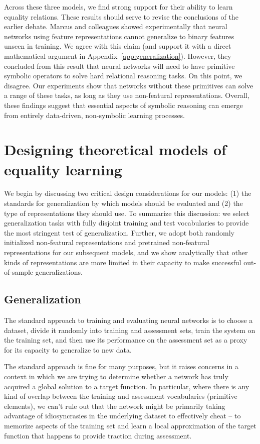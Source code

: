 \documentclass{article}
\newcommand{\appref}[1]{Appendix~\ref{#1}}
\renewcommand{\cite}{\citep}
\begin{document}
Across these three models, we find strong support for their ability to learn equality relations. These results should serve to revise the conclusions of the earlier debate. Marcus and colleagues \cite{marcus:1999,marcus:2001} showed experimentally that neural networks using feature representations cannot generalize to binary features unseen in training. We agree with this claim (and support it with a direct mathematical argument in \appref{app:generalization}). However, they concluded from this result that neural networks will need to have primitive symbolic operators to solve hard relational reasoning tasks. On this point, we disagree. Our experiments show that networks without these primitives can solve a range of these tasks, as long as they use non-featural representations. Overall, these findings suggest that essential aspects of symbolic reasoning can emerge from entirely data-driven, non-symbolic learning processes.

\section{Designing theoretical models of equality learning}

We begin by discussing two critical design considerations for our models: (1) the standards for generalization by which models should be evaluated and (2) the type of representations they should use. To summarize this discussion: we select generalization tasks with fully disjoint training and test vocabularies to provide the most stringent test of generalization. Further, we adopt both randomly initialized non-featural representations and pretrained non-featural representations for our subsequent models, and we show analytically that other kinds of representations are more limited in their capacity to make successful out-of-sample generalizations.


\subsection{Generalization}

The standard approach to training and evaluating neural networks is to choose a dataset, divide it randomly into training and assessment sets, train the system on the training set, and then use its performance on the assessment set as a proxy for its capacity to generalize to new data.

The standard approach is fine for many purposes, but it raises concerns in a context in which we are trying to determine whether a network has truly acquired a global solution to a target function. In particular, where there is any kind of overlap between the training and assessment vocabularies (primitive elements), we can't rule out that the network might be primarily taking advantage of idiosyncrasies in the underlying dataset to effectively cheat -- to memorize aspects of the training set and learn a local approximation of the target function that happens to provide traction during assessment.
\end{document}

